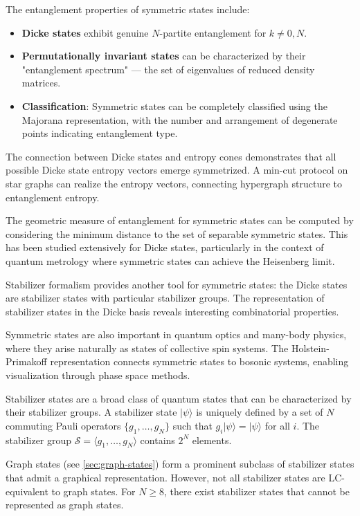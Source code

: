 \documentclass[12pt,a4paper]{article}
\begin{document}
The entanglement properties of symmetric states include:
\begin{itemize}
	\item \textbf{Dicke states} exhibit genuine $N$-partite entanglement for $k \neq 0, N$.
	\item \textbf{Permutationally invariant states} can be characterized by their "entanglement spectrum" --- the set of eigenvalues of reduced density matrices.
	\item \textbf{Classification}: Symmetric states can be completely classified using the Majorana representation, with the number and arrangement of degenerate points indicating entanglement type.
\end{itemize}

The connection between Dicke states and entropy cones demonstrates that all possible Dicke state entropy vectors emerge symmetrized. A min-cut protocol on star graphs can realize the entropy vectors, connecting hypergraph structure to entanglement entropy.

The geometric measure of entanglement for symmetric states can be computed by considering the minimum distance to the set of separable symmetric states. This has been studied extensively for Dicke states, particularly in the context of quantum metrology where symmetric states can achieve the Heisenberg limit.

Stabilizer formalism provides another tool for symmetric states: the Dicke states are stabilizer states with particular stabilizer groups. The representation of stabilizer states in the Dicke basis reveals interesting combinatorial properties.

Symmetric states are also important in quantum optics and many-body physics, where they arise naturally as states of collective spin systems. The Holstein-Primakoff representation connects symmetric states to bosonic systems, enabling visualization through phase space methods.

Stabilizer states are a broad class of quantum states that can be characterized by their stabilizer groups. A stabilizer state $|\psi\rangle$ is uniquely defined by a set of $N$ commuting Pauli operators $\{g_1, \ldots, g_N\}$ such that $g_i |\psi\rangle = |\psi\rangle$ for all $i$. The stabilizer group $\mathcal{S} = \langle g_1, \ldots, g_N \rangle$ contains $2^N$ elements.

Graph states (see \cref{sec:graph-states}) form a prominent subclass of stabilizer states that admit a graphical representation. However, not all stabilizer states are LC-equivalent to graph states. For $N \geq 8$, there exist stabilizer states that cannot be represented as graph states.
\end{document}

